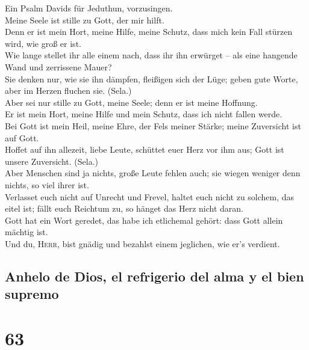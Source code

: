  Ein Psalm Davids für Jeduthun, vorzusingen.\\
 Meine Seele ist stille zu Gott, der mir hilft.\\
 Denn er ist mein Hort, meine Hilfe, meine Schutz, dass
mich kein Fall stürzen wird, wie groß er ist.\\
 Wie lange stellet ihr alle einem nach, dass ihr ihn
erwürget -- als eine hangende Wand und zerrissene Mauer?\\
 Sie denken nur, wie sie ihn dämpfen, fleißigen sich der
Lüge; geben gute Worte, aber im Herzen fluchen sie. (Sela.)\\
 Aber sei nur stille zu Gott, meine Seele; denn er ist
meine Hoffnung.\\
 Er ist mein Hort, meine Hilfe und mein Schutz, dass ich
nicht fallen werde.\\
 Bei Gott ist mein Heil, meine Ehre, der Fels meiner
Stärke; meine Zuversicht ist auf Gott.\\
 Hoffet auf ihn allezeit, liebe Leute, schüttet euer Herz
vor ihm aus; Gott ist unsere Zuversicht. (Sela.)\\
 Aber Menschen sind ja nichts, große Leute fehlen auch;
sie wiegen weniger denn nichts, so viel ihrer ist.\\
 Verlasset euch nicht auf Unrecht und Frevel, haltet euch
nicht zu solchem, das eitel ist; fällt euch Reichtum zu, so hänget das
Herz nicht daran.\\
 Gott hat ein Wort geredet, das habe ich etlichemal
gehört: dass Gott allein mächtig ist.\\
 Und du, \textsc{Herr}, bist gnädig und bezahlst einem
jeglichen, wie er's verdient.

\hypertarget{anhelo-de-dios-el-refrigerio-del-alma-y-el-bien-supremo}{%
\subsection{Anhelo de Dios, el refrigerio del alma y el bien
supremo}\label{anhelo-de-dios-el-refrigerio-del-alma-y-el-bien-supremo}}

\hypertarget{section-62}{%
\section{63}\label{section-62}}

